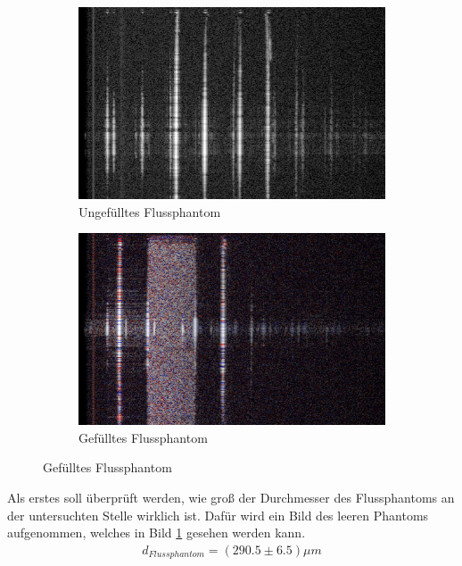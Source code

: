 \documentclass[german, %
parskip=full, %
bibliography=totoc, %
]{scrartcl}
\begin{document}
\begin{figure}[ht]
	\centering
	\begin{subfigure}[b]{0.4\textwidth}
		\includegraphics[width=\textwidth]{KapillarLuft}
	  \caption{Ungefülltes Flussphantom}
	  \label{fig:leerkap}
  \end{subfigure}
  \begin{subfigure}[b]{0.4\textwidth}
	  \includegraphics[width=\textwidth]{KapillarEmulsion}
	  \caption{Gefülltes Flussphantom}
	  \label{fig:fuelkap}
  \end{subfigure}
\end{figure}

Als erstes soll überprüft werden, wie groß der Durchmesser des Flussphantoms an der untersuchten Stelle wirklich ist. Dafür wird ein Bild des leeren Phantoms aufgenommen, welches in Bild \ref{fig:leerkap} gesehen werden kann. 
\begin{align*}
d_{Flussphantom} = (290.5 \pm 6.5) \mu m
\end{align*}
\end{document}
